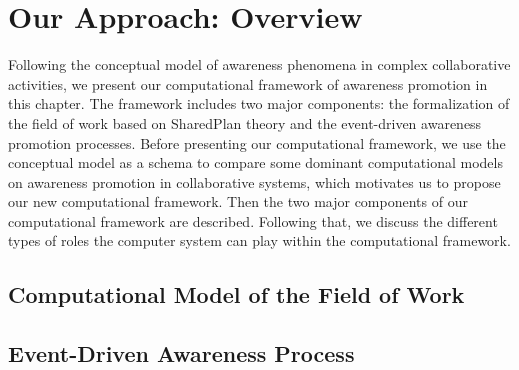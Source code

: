 \graphicspath{{Figures/}}

\chapter{Our Approach: Overview} %
\label{cha:computational_framework}

Following the conceptual model of awareness phenomena in complex collaborative activities, we present our computational framework of awareness promotion in this chapter. The framework includes two major components: the formalization of the field of work based on SharedPlan theory and the event-driven awareness promotion processes. Before presenting our computational framework, we use the conceptual model as a schema to compare some dominant computational models on awareness promotion in collaborative systems, which motivates us to propose our new computational framework. Then the two major components of our computational framework are described. Following that, we discuss the different types of roles the computer system can play within the computational framework. 

\section{Computational Model of the Field of Work} %
\label{sec:computational_model_of_the_field_of_work}


\section{Event-Driven Awareness Process}
\label{sec:event_driven_awareness_process}

